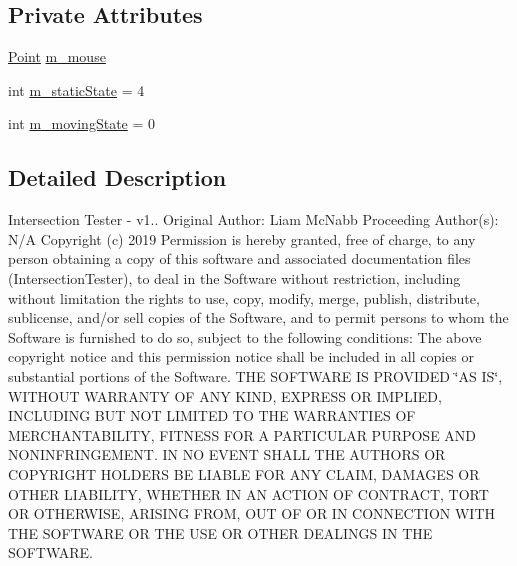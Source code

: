 \subsection*{Private Attributes}
\begin{DoxyCompactItemize}
\item 
\hyperlink{class_point}{Point} \hyperlink{class_canvas_a37d2fd203dc21501aee37001e49789b1}{m\+\_\+mouse}
\item 
int \hyperlink{class_canvas_adb29cf13087e13c9d4a1ef04bc53b931}{m\+\_\+static\+State} = 4
\item 
int \hyperlink{class_canvas_a0d0f98258b42bd7b40f175baf3f1220a}{m\+\_\+moving\+State} = 0
\end{DoxyCompactItemize}


\subsection{Detailed Description}
Intersection Tester -\/ v1.. Original Author\+: Liam Mc\+Nabb Proceeding Author(s)\+: N/A Copyright (c) 2019 Permission is hereby granted, free of charge, to any person obtaining a copy of this software and associated documentation files (Intersection\+Tester), to deal in the Software without restriction, including without limitation the rights to use, copy, modify, merge, publish, distribute, sublicense, and/or sell copies of the Software, and to permit persons to whom the Software is furnished to do so, subject to the following conditions\+: The above copyright notice and this permission notice shall be included in all copies or substantial portions of the Software. T\+HE S\+O\+F\+T\+W\+A\+RE IS P\+R\+O\+V\+I\+D\+ED \char`\"{}\+A\+S I\+S\char`\"{}, W\+I\+T\+H\+O\+UT W\+A\+R\+R\+A\+N\+TY OF A\+NY K\+I\+ND, E\+X\+P\+R\+E\+SS OR I\+M\+P\+L\+I\+ED, I\+N\+C\+L\+U\+D\+I\+NG B\+UT N\+OT L\+I\+M\+I\+T\+ED TO T\+HE W\+A\+R\+R\+A\+N\+T\+I\+ES OF M\+E\+R\+C\+H\+A\+N\+T\+A\+B\+I\+L\+I\+TY, F\+I\+T\+N\+E\+SS F\+OR A P\+A\+R\+T\+I\+C\+U\+L\+AR P\+U\+R\+P\+O\+SE A\+ND N\+O\+N\+I\+N\+F\+R\+I\+N\+G\+E\+M\+E\+NT. IN NO E\+V\+E\+NT S\+H\+A\+LL T\+HE A\+U\+T\+H\+O\+RS OR C\+O\+P\+Y\+R\+I\+G\+HT H\+O\+L\+D\+E\+RS BE L\+I\+A\+B\+LE F\+OR A\+NY C\+L\+A\+IM, D\+A\+M\+A\+G\+ES OR O\+T\+H\+ER L\+I\+A\+B\+I\+L\+I\+TY, W\+H\+E\+T\+H\+ER IN AN A\+C\+T\+I\+ON OF C\+O\+N\+T\+R\+A\+CT, T\+O\+RT OR O\+T\+H\+E\+R\+W\+I\+SE, A\+R\+I\+S\+I\+NG F\+R\+OM, O\+UT OF OR IN C\+O\+N\+N\+E\+C\+T\+I\+ON W\+I\+TH T\+HE S\+O\+F\+T\+W\+A\+RE OR T\+HE U\+SE OR O\+T\+H\+ER D\+E\+A\+L\+I\+N\+GS IN T\+HE S\+O\+F\+T\+W\+A\+RE. 

